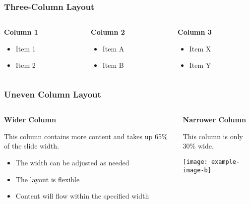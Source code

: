 \documentclass[aspectratio=169,professionalfonts]{beamer}
\begin{document}
\begin{frame}
    \frametitle{Three-Column Layout}
    
    \begin{columns}[T]
        \begin{column}{0.3\textwidth}
            \textbf{Column 1}
            \begin{itemize}
                \item Item 1
                \item Item 2
            \end{itemize}
        \end{column}
        
        \begin{column}{0.3\textwidth}
            \textbf{Column 2}
            \begin{itemize}
                \item Item A
                \item Item B
            \end{itemize}
        \end{column}
        
        \begin{column}{0.3\textwidth}
            \textbf{Column 3}
            \begin{itemize}
                \item Item X
                \item Item Y
            \end{itemize}
        \end{column}
    \end{columns}
\end{frame}

\begin{frame}
    \frametitle{Uneven Column Layout}
    
    \begin{columns}[T]
        \begin{column}{0.65\textwidth}
            \textbf{Wider Column}
            
            This column contains more content and takes up 65\% of the slide width.
            
            \begin{itemize}
                \item The width can be adjusted as needed
                \item The layout is flexible
                \item Content will flow within the specified width
            \end{itemize}
        \end{column}
        
        \begin{column}{0.3\textwidth}
            \textbf{Narrower Column}
            
            This column is only 30\% wide.
            
            \texttt{[image: example-image-b]}
        \end{column}
    \end{columns}
\end{frame}
\end{document}
